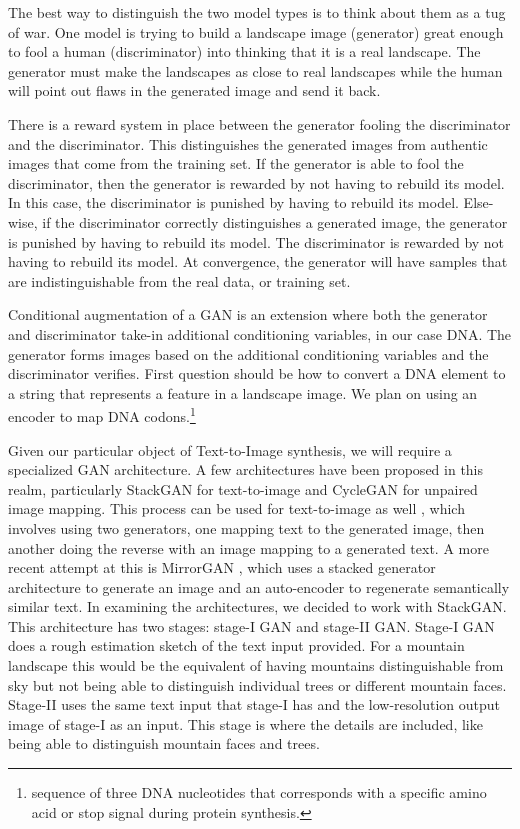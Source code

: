 \documentclass{article}
\begin{document}
	The best way to distinguish the two model types is to think about them as a tug of war. One model is trying to build a landscape image (generator) great enough to fool a human (discriminator) into thinking that it is a real landscape. The generator must make the landscapes as close to real landscapes while the human will point out flaws in the generated image and send it back.  
	
	There is a reward system in place between the generator fooling the discriminator and the discriminator.  This distinguishes the generated images from authentic images that come from the training set. If the generator is able to fool the discriminator, then the generator is rewarded by not having to rebuild its model.  In this case, the discriminator is punished by having to rebuild its model. Else-wise, if the discriminator correctly distinguishes a generated image, the generator is punished by having to rebuild its model.  The discriminator is rewarded by not having to rebuild its model. At convergence, the generator will have samples that are indistinguishable from the real data, or training set.  
	
	Conditional augmentation of a GAN is an extension where both the generator and discriminator take-in additional conditioning variables, in our case DNA.  The generator forms images based on the additional conditioning variables and the discriminator verifies. First question should be how to convert a DNA element to a string that represents a feature in a landscape image. We plan on using an encoder to map DNA codons.\footnote{sequence of three DNA nucleotides that corresponds with a specific amino acid or stop signal during protein synthesis.}  
	
	Given our particular object of Text-to-Image synthesis, we will require a specialized GAN architecture. A few architectures have been proposed in this realm, particularly StackGAN \cite{zhang2017stackgan} for text-to-image and CycleGAN \cite{CycleGAN2017} for unpaired image mapping. This process can be used for text-to-image as well \cite{BERT2020}, which involves using two generators, one mapping text to the generated image, then another doing the reverse with an image mapping to a generated text. A more recent attempt at this is MirrorGAN \cite{qiao2019mirrorgan}, which uses a stacked generator architecture to generate an image and an auto-encoder to regenerate semantically similar text. In examining the architectures, we decided to work with StackGAN. This architecture has two stages: stage-I GAN and stage-II GAN. Stage-I GAN does a rough estimation sketch of the text input provided. For a mountain landscape this would be the equivalent of having mountains distinguishable from sky but not being able to distinguish individual trees or different mountain faces. Stage-II uses the same text input that stage-I has and the low-resolution output image of stage-I as an input. This stage is where the details are included, like being able to distinguish mountain faces and trees.   
	
\end{document}
